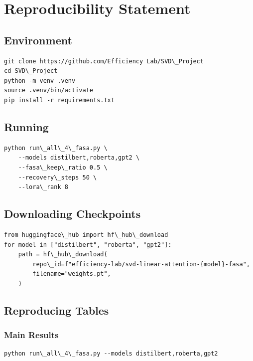 
\section{Reproducibility Statement}

\subsection{Environment}

\begin{lstlisting}
git clone https://github.com/Efficiency Lab/SVD\_Project
cd SVD\_Project
python -m venv .venv
source .venv/bin/activate
pip install -r requirements.txt
\end{lstlisting}

\subsection{Running}

\begin{lstlisting}
python run\_all\_4\_fasa.py \
    --models distilbert,roberta,gpt2 \
    --fasa\_keep\_ratio 0.5 \
    --recovery\_steps 50 \
    --lora\_rank 8
\end{lstlisting}

\subsection{Downloading Checkpoints}

\begin{lstlisting}
from huggingface\_hub import hf\_hub\_download
for model in ["distilbert", "roberta", "gpt2"]:
    path = hf\_hub\_download(
        repo\_id=f"efficiency-lab/svd-linear-attention-{model}-fasa",
        filename="weights.pt",
    )
\end{lstlisting}

\subsection{Reproducing Tables}

\subsubsection{Main Results}

\begin{lstlisting}
python run\_all\_4\_fasa.py --models distilbert,roberta,gpt2
\end{lstlisting}

